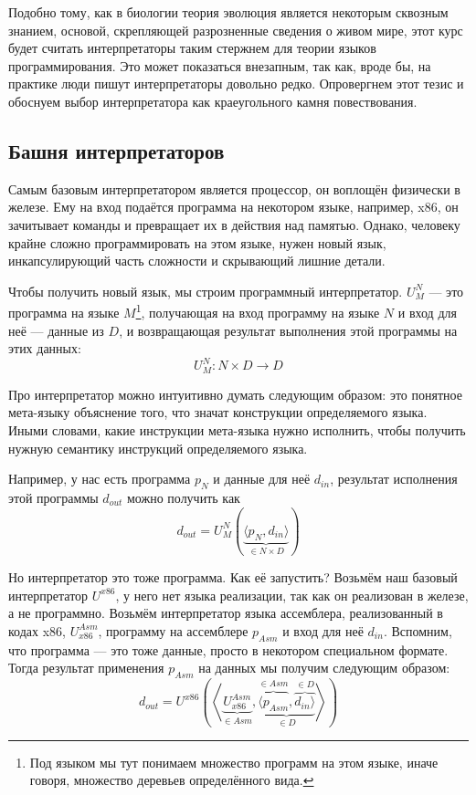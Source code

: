 Подобно тому, как в биологии теория эволюция является некоторым сквозным знанием, основой, скрепляющей разрозненные сведения о живом мире, этот курс будет считать интерпретаторы таким стержнем для теории языков программирования.
Это может показаться внезапным, так как, вроде бы, на практике люди пишут интерпретаторы довольно редко.
Опровергнем этот тезис и обоснуем выбор интерпретатора как краеугольного камня повествования.

\subsection{Башня интерпретаторов} \label{subsec:interpreters-tower}

Самым базовым интерпретатором является процессор, он воплощён физически в железе.
Ему на вход подаётся программа на некотором языке, например, x86, он зачитывает команды и превращает их в действия над памятью.
Однако, человеку крайне сложно программировать на этом языке, нужен новый язык, инкапсулирующий часть сложности и скрывающий лишние детали.

Чтобы получить новый язык, мы строим программный интерпретатор.
 $U_M^N$ --- это программа на языке $M$\footnote{Под языком мы тут понимаем множество программ на этом языке, иначе говоря, множество деревьев определённого вида.}, получающая на вход программу на языке $N$ и вход для неё --- данные из $D$, и возвращающая результат выполнения этой программы на этих данных: \[U_M^N : N\times D\to D\]

Про интерпретатор можно интуитивно думать следующим образом: это понятное мета-языку объяснение того, что значат конструкции определяемого языка.
Иными словами, какие инструкции мета-языка нужно исполнить, чтобы получить нужную семантику инструкций определяемого языка.

Например, у нас есть программа $p_N$ и данные для неё $d_{in}$, результат исполнения этой программы $d_{out}$ можно получить как \[d_{out} = U_M^N\left( \underbrace{\langle p_N, d_{in} \rangle}_{\in N\times D} \right)\]

Но интерпретатор это тоже программа.
Как её запустить?
Возьмём наш базовый интерпретатор $U^{x86}$, у него нет языка реализации, так как он реализован в железе, а не программно.
Возьмём интерпретатор языка ассемблера, реализованный в кодах x86, $U_{x86}^{Asm}$, программу на ассемблере $p_{Asm}$ и вход для неё $d_{in}$.
Вспомним, что программа --- это тоже данные, просто в некотором специальном формате.
Тогда результат применения $p_{Asm}$ на данных мы получим следующим образом:
\[
    d_{out} = U^{x86}\left(\left<\underbrace{U_{x86}^{Asm}}_{\in Asm}, \underbrace{\overbrace{\langle p_{Asm}}^{\in Asm}, \overbrace{d_{in} \rangle}^{\in D}}_{\in D} \right>\right)
\]


